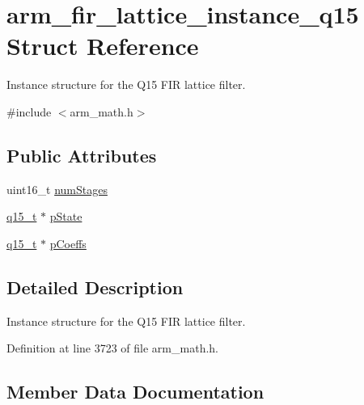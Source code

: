 \hypertarget{structarm__fir__lattice__instance__q15}{}\section{arm\+\_\+fir\+\_\+lattice\+\_\+instance\+\_\+q15 Struct Reference}
\label{structarm__fir__lattice__instance__q15}


Instance structure for the Q15 F\+IR lattice filter.  




{\ttfamily \#include $<$arm\+\_\+math.\+h$>$}

\subsection*{Public Attributes}
\begin{DoxyCompactItemize}
\item 
uint16\+\_\+t \hyperlink{structarm__fir__lattice__instance__q15_a38b179138d6a6c9cac4f8f79b6fd5357}{num\+Stages}
\item 
\hyperlink{arm__math_8h_ab5a8fb21a5b3b983d5f54f31614052ea}{q15\+\_\+t} $\ast$ \hyperlink{structarm__fir__lattice__instance__q15_a37b90dea2bc3ee7c9951a9fe74db0cbb}{p\+State}
\item 
\hyperlink{arm__math_8h_ab5a8fb21a5b3b983d5f54f31614052ea}{q15\+\_\+t} $\ast$ \hyperlink{structarm__fir__lattice__instance__q15_a78f872826140069cf67836fff87360bc}{p\+Coeffs}
\end{DoxyCompactItemize}


\subsection{Detailed Description}
Instance structure for the Q15 F\+IR lattice filter. 

Definition at line 3723 of file arm\+\_\+math.\+h.



\subsection{Member Data Documentation}
\mbox{\label{structarm__fir__lattice__instance__q15_a38b179138d6a6c9cac4f8f79b6fd5357}} 
